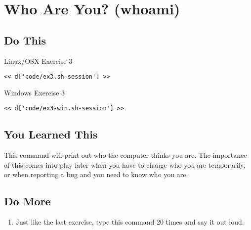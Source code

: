 \chapter{Who Are You? (whoami)}

\section{Do This}

\begin{code}{Linux/OSX Exercise 3}
\begin{Verbatim}
<< d['code/ex3.sh-session'] >>
\end{Verbatim}
\end{code}

\begin{code}{Windows Exercise 3}
\begin{Verbatim}
<< d['code/ex3-win.sh-session'] >>
\end{Verbatim}
\end{code}

\section{You Learned This}

This command will print out who the computer thinks you are.  The importance
of this comes into play later when you have to change who you are temporarily,
or when reporting a bug and you need to know who you are.

\section{Do More}

\begin{enumerate}
\item Just like the last exercise, type this command 20 times and say it out loud.
\end{enumerate}

